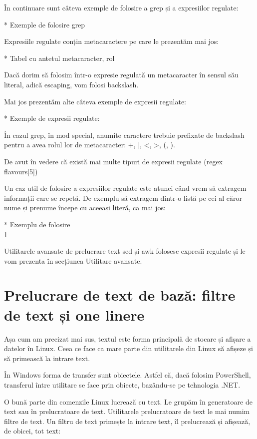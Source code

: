 În continuare sunt câteva exemple de folosire a grep și a expresiilor regulate:

* Exemple de folosire grep

Expresiile regulate conțin metacaractere pe care le prezentăm mai jos:

* Tabel cu antetul metacaracter, rol

Dacă dorim să folosim într-o expresie regulată un metacaracter în sensul său
literal, adică escaping, vom folosi backslash.

Mai jos prezentăm alte câteva exemple de expresii regulate:

* Exemple de expresii regulate:

În cazul grep, în mod special, anumite caractere trebuie prefixate de backslash
pentru a avea rolul lor de metacaracter: +, |, <, >, (, ).

De avut în vedere că există mai multe tipuri de expresii regulate (regex
flavours[5])

Un caz util de folosire a expresiilor regulate este atunci când vrem să extragem
informații care se repetă. De exemplu să extragem dintr-o listă pe cei al căror
nume și prenume începe cu aceeași literă, ca mai jos:

* Exemplu de folosire \\1

Utilitarele avansate de prelucrare text sed și awk folosesc expresii regulate și
le vom prezenta în secțiunea Utilitare avansate.

\section{Prelucrare de text de bază: filtre de text și one linere}
\label{sec:cli-basic-proc}

Așa cum am precizat mai sus, textul este forma principală de stocare și afișare
a datelor în Linux. Ceea ce face ca mare parte din utilitarele din Linux să
afișeze și să primească la intrare text.

În Windows forma de transfer sunt obiectele. Astfel că, dacă folosim PowerShell,
transferul între utilitare se face prin obiecte, bazându-se pe tehnologia .NET.

O bună parte din comenzile Linux lucrează cu text. Le grupăm în generatoare de
text sau în prelucratoare de text. Utilitarele prelucratoare de text le mai
numim filtre de text. Un filtru de text primește la intrare text, îl prelucrează
și afișează, de obicei, tot text:

